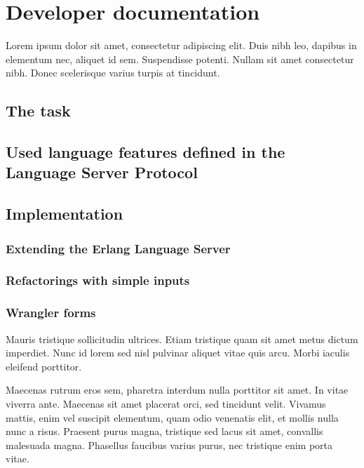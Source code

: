 \chapter{Developer documentation}
\label{ch:impl}

Lorem ipsum dolor sit amet, consectetur adipiscing elit. Duis nibh leo, dapibus in elementum nec, aliquet id sem. Suspendisse potenti. Nullam sit amet consectetur nibh. Donec scelerisque varius turpis at tincidunt.


\section{The task}

\section{Used language features defined in the Language Server Protocol}

\section{Implementation}
\subsection{Extending the Erlang Language Server}
\subsection{Refactorings with simple inputs}
\subsection{Wrangler forms}

\begin{definition}
Mauris tristique sollicitudin ultrices. Etiam tristique quam sit amet metus dictum imperdiet. Nunc id lorem sed nisl pulvinar aliquet vitae quis arcu. Morbi iaculis eleifend porttitor.
\end{definition}

Maecenas rutrum eros sem, pharetra interdum nulla porttitor sit amet. In vitae viverra ante. Maecenas sit amet placerat orci, sed tincidunt velit. Vivamus mattis, enim vel suscipit elementum, quam odio venenatis elit, et mollis nulla nunc a risus. Praesent purus magna, tristique sed lacus sit amet, convallis malesuada magna. Phasellus faucibus varius purus, nec tristique enim porta vitae.

